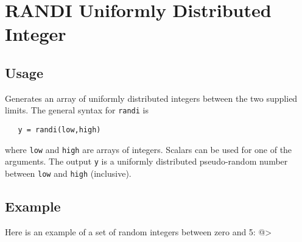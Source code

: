 \section{RANDI Uniformly Distributed Integer}

\subsection{Usage}

Generates an array of uniformly distributed integers between
the two supplied limits.  The general syntax for \verb|randi| is
\begin{verbatim}
   y = randi(low,high)
\end{verbatim}
where \verb|low| and \verb|high| are arrays of integers.  Scalars
can be used for one of the arguments.  The output \verb|y| is
a uniformly distributed pseudo-random number between \verb|low|
and \verb|high| (inclusive).
\subsection{Example}

Here is an example of a set of random integers between 
zero and 5:
@>
